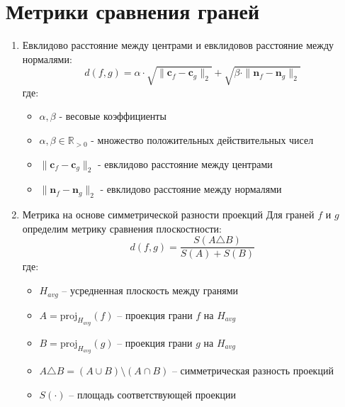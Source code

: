 \documentclass[a4paper,12pt]{article}
\begin{document}
\section{Метрики сравнения граней}
\begin{enumerate}
    \item Евклидово расстояние между центрами и евклидовов расстояние между нормалями:
        \begin{equation}
            d(f,g) = \alpha \cdot \sqrt{\|\mathbf{c}_f - \mathbf{c}_g\|_2} + \sqrt{\beta \cdot \|\mathbf{n}_f - \mathbf{n}_g\|_2} 
        \end{equation}
        \noindent где:
        \begin{itemize}
            \item $\alpha, \beta$ - весовые коэффициенты
            \item $\alpha, \beta \in \mathbb{R}_{>0}$ - множество положительных действительных чисел
            \item $\|\mathbf{c}_f - \mathbf{c}_g\|_2$ - евклидово расстояние между центрами
            \item $\|\mathbf{n}_f - \mathbf{n}_g\|_2$ - евклидово расстояние между нормалями
        \end{itemize}

    \item Метрика на основе симметрической разности проекций
        Для граней $f$ и $g$ определим метрику сравнения плоскостности:
        \begin{equation}
            d(f,g) = \frac{S(A \triangle B)}{S(A) + S(B)}
        \end{equation}
        где:
        \begin{itemize}
            \item $H_{avg}$ -- усредненная плоскость между гранями

            \item $A = \text{proj}_{H_{avg}}(f)$ -- проекция грани $f$ на $H_{avg}$

            \item $B = \text{proj}_{H_{avg}}(g)$ -- проекция грани $g$ на $H_{avg}$

            \item $A \triangle B = (A \cup B) \setminus (A \cap B)$ -- симметрическая разность проекций

            \item $S(\cdot)$ -- площадь соответствующей проекции
        \end{itemize}


\end{enumerate}
\end{document}
